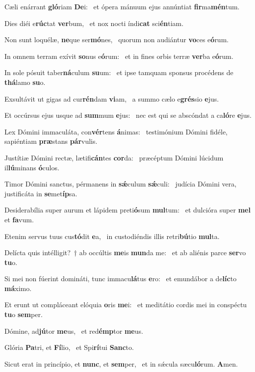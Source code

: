 \item Cæli enárrant \textbf{gló}riam \textbf{De}i:~\psstar{} et ópera mánuum ejus annúntiat \textbf{fir}ma\textbf{mén}tum.
\item Dies diéi e\textbf{rúc}tat \textbf{ver}bum,~\psstar{} et nox nocti índi\textbf{cat} sci\textbf{én}tiam.
\item Non sunt loquélæ, \textbf{ne}que ser\textbf{mó}nes,~\psstar{} quorum non audiántur \textbf{vo}ces e\textbf{ó}rum.
\item In omnem terram exívit \textbf{so}nus e\textbf{ó}rum:~\psstar{} et in fines orbis terræ \textbf{ver}ba e\textbf{ó}rum.
\item In sole pósuit taber\textbf{ná}culum \textbf{su}um:~\psstar{} et ipse tamquam sponsus procédens de \textbf{thá}lamo \textbf{su}o.
\item Exsultávit ut gigas ad cur\textbf{rén}dam \textbf{vi}am,~\psstar{} a summo cælo e\textbf{grés}sio \textbf{e}jus.
\item Et occúrsus ejus usque ad \textbf{sum}mum \textbf{e}jus:~\psstar{} nec est qui se abscóndat a ca\textbf{ló}re \textbf{e}jus.
\item Lex Dómini immaculáta, con\textbf{vér}tens \textbf{á}nimas:~\psstar{} testimónium Dómini fidéle, sapiéntiam \textbf{præ}stans \textbf{pár}vulis.
\item Justítiæ Dómini rectæ, lætifi\textbf{cán}tes \textbf{cor}da:~\psstar{} præcéptum Dómini lúcidum il\textbf{lú}minans \textbf{ó}culos.
\item Timor Dómini sanctus, pérmanens in \textbf{sǽ}culum \textbf{sǽ}culi:~\psstar{} judícia Dómini vera, justificáta in \textbf{se}met\textbf{íp}sa.
\item Desiderabília super aurum et lápidem preti\textbf{ó}sum \textbf{mul}tum:~\psstar{} et dulcióra super \textbf{mel} et \textbf{fa}vum.
\item Etenim servus tuus cus\textbf{tó}dit \textbf{e}a,~\psstar{} in custodiéndis illis retri\textbf{bú}tio \textbf{mul}ta.
\item Delícta quis intélligit?~† ab occúltis \textbf{me}is \textbf{mun}da me:~\psstar{} et ab aliénis parce \textbf{ser}vo \textbf{tu}o.
\item Si mei non fúerint domináti, tunc immacu\textbf{lá}tus \textbf{e}ro:~\psstar{} et emundábor a de\textbf{líc}to \textbf{má}ximo.
\item Et erunt ut compláceant elóquia \textbf{o}ris \textbf{me}i:~\psstar{} et meditátio cordis mei in conspéctu \textbf{tu}o \textbf{sem}per.
\item Dómine, ad\textbf{jú}tor \textbf{me}us,~\psstar{} et red\textbf{émp}tor \textbf{me}us.
\item Glória \textbf{Pa}tri, et \textbf{Fí}lio,~\psstar{} et Spi\textbf{rí}tui \textbf{Sanc}to.
\item Sicut erat in princípio, et \textbf{nunc}, et \textbf{sem}per,~\psstar{} et in sǽcula sæcu\textbf{ló}rum. \textbf{A}men.
